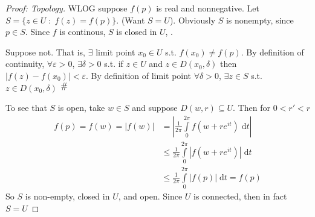 \documentclass{article}
\newcommand{\contra}{\raisebox{\depth}{\#}}
\begin{document}
\begin{proof}[Proof: Topology]
WLOG suppose $f(p)$ is real and nonnegative. Let $S = \{z \in U \;:\; f(z) = f(p)\}$. (Want $S = U$). Obviously $S$ is nonempty, since $p \in S$. Since $f$ is continous, $S$ is closed in $U$, .

Suppose not. That is, $\exists$ limit point $x_0 \in U$ s.t. $f(x_0) \neq f(p)$. By definition of continuity, $\forall \varepsilon > 0$, $\exists \delta > 0$ s.t. if $z \in U$ and $z \in D(x_0, \delta)$ then $|f(z) - f(x_0)| < \varepsilon$. By definition of limit point $\forall \delta > 0$, $\exists z \in S$ s.t. $z \in D(x_0, \delta)$ $\contra$

To see that $S$ is open, take $w \in S$ and suppose $D(w, r) \subseteq U$. Then for $0 < r' < r$
\begin{equation*}
\begin{split}
f(p) = f(w) = |f(w)| &= \left| \frac{1}{2\pi} \int\limits_0^{2\pi} f(w + re^{it}) \;\mathrm{d}t \right|\\
&\leq \frac{1}{2\pi} \int\limits_0^{2\pi} \left| f(w+re^{it}) \right| \;\mathrm{d}t\\
&\leq \frac{1}{2\pi} \int\limits_0^{2\pi} \left| f(p) \right| \;\mathrm{d}t = f(p)
\end{split}
\end{equation*}
So $S$ is non-empty, closed in $U$, and open. Since $U$ is connected, then in fact $S = U$
\end{proof}
\end{document}
